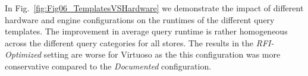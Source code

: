 
In Fig.~\ref{fig:Fig06_TemplatesVSHardware} we demonstrate the impact of different hardware and engine configurations on the runtimes of the different query templates. The improvement in average query runtime is rather homogeneous across the different query categories for all stores. The results in the \emph{RFI-Optimized} setting are worse for Virtuoso as the this configuration was more conservative compared to the \emph{Documented} configuration.
